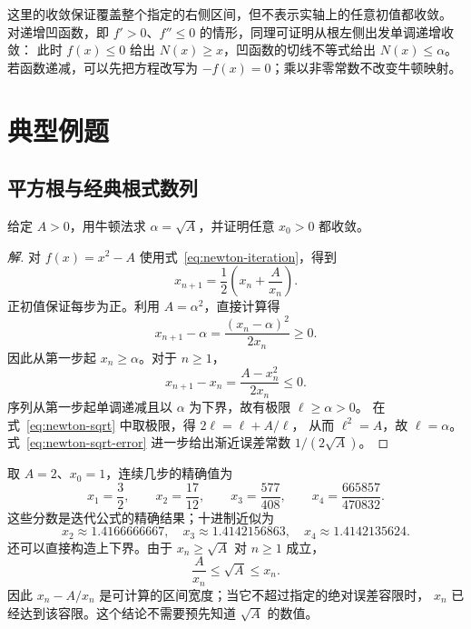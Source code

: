 \documentclass[UTF8,12pt,a4paper,fontset=fandol]{ctexart}
\begin{document}
这里的收敛保证覆盖整个指定的右侧区间，但不表示实轴上的任意初值都收敛。
对递增凹函数，即 $f'>0$、$f''\le0$ 的情形，同理可证明从根左侧出发单调递增收敛：
此时 $f(x)\le0$ 给出 $N(x)\ge x$，凹函数的切线不等式给出 $N(x)\le\alpha$。
若函数递减，可以先把方程改写为 $-f(x)=0$；乘以非零常数不改变牛顿映射。

\section{典型例题}
\label{sec:newton-examples}

\subsection{平方根与经典根式数列}

\begin{example}[计算正平方根]\label{ex:newton-sqrt}
给定 $A>0$，用牛顿法求 $\alpha=\sqrt A$，并证明任意 $x_0>0$ 都收敛。
\end{example}

\begin{proof}[解]
对 $f(x)=x^2-A$ 使用式~\eqref{eq:newton-iteration}，得到
\begin{equation}\label{eq:newton-sqrt}
  x_{n+1}=\frac12\left(x_n+\frac{A}{x_n}\right).
\end{equation}
正初值保证每步为正。利用 $A=\alpha^2$，直接计算得
\begin{equation}\label{eq:newton-sqrt-error}
  x_{n+1}-\alpha=\frac{(x_n-\alpha)^2}{2x_n}\ge0.
\end{equation}
因此从第一步起 $x_n\ge\alpha$。对于 $n\ge1$，
\[
  x_{n+1}-x_n=\frac{A-x_n^2}{2x_n}\le0.
\]
序列从第一步起单调递减且以 $\alpha$ 为下界，故有极限 $\ell\ge\alpha>0$。
在式~\eqref{eq:newton-sqrt} 中取极限，得 $2\ell=\ell+A/\ell$，
从而 $\ell^2=A$，故 $\ell=\alpha$。
式~\eqref{eq:newton-sqrt-error} 进一步给出渐近误差常数 $1/(2\sqrt A)$。
\end{proof}

取 $A=2$、$x_0=1$，连续几步的精确值为
\[
  x_1=\frac32,\qquad x_2=\frac{17}{12},\qquad
  x_3=\frac{577}{408},\qquad x_4=\frac{665857}{470832}.
\]
这些分数是迭代公式的精确结果；十进制近似为
\[
  x_2\approx1.4166666667,\quad
  x_3\approx1.4142156863,\quad
  x_4\approx1.4142135624.
\]
还可以直接构造上下界。由于 $x_n\ge\sqrt A$ 对 $n\ge1$ 成立，
\[
  \frac{A}{x_n}\le\sqrt A\le x_n.
\]
因此 $x_n-A/x_n$ 是可计算的区间宽度；当它不超过指定的绝对误差容限时，
$x_n$ 已经达到该容限。这个结论不需要预先知道 $\sqrt A$ 的数值。
\end{document}
